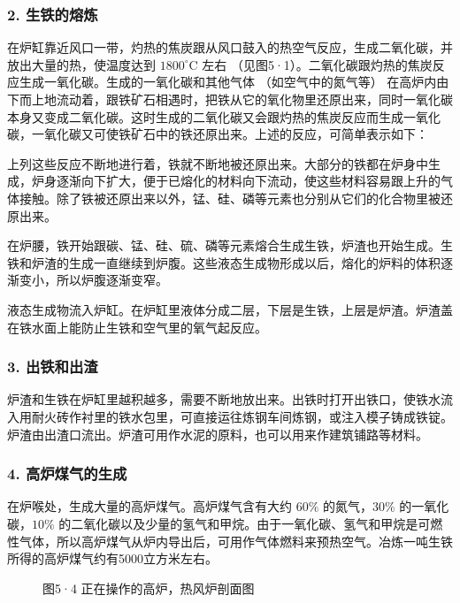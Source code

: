 \subsubsection{2. 生铁的熔炼}

在炉缸靠近风口一带，灼热的焦炭跟从风口鼓入的热空气反应，生成二氧化碳，并放出大量的热，使温度达到
\(1800^{\circ} \mathrm{C}\) 左右
（见图5·1）。二氧化碳跟灼热的焦炭反应生成一氧化碳。生成的一氧化碳和其他气体
（如空气中的氮气等）
在高炉内由下而上地流动着，跟铁矿石相遇时，把铁从它的氧化物里还原出来，同时一氧化碳本身又变成二氧化碳。这时生成的二氧化碳又会跟灼热的焦炭反应而生成一氧化碳，一氧化碳又可使铁矿石中的铁还原出来。上述的反应，可简单表示如下：

上列这些反应不断地进行着，铁就不断地被还原出来。大部分的铁都在炉身中生成，炉身逐渐向下扩大，便于已熔化的材料向下流动，使这些材料容易跟上升的气体接触。除了铁被还原出来以外，锰、硅、磷等元素也分别从它们的化合物里被还原出来。

在炉腰，铁开始跟碳、锰、硅、硫、磷等元素熔合生成生铁，炉渣也开始生成。生铁和炉渣的生成一直继续到炉腹。这些液态生成物形成以后，熔化的炉料的体积逐渐变小，所以炉腹逐渐变窄。

液态生成物流入炉缸。在炉缸里液体分成二层，下层是生铁，上层是炉渣。炉渣盖在铁水面上能防止生铁和空气里的氧气起反应。

\subsubsection{3. 出铁和出渣}

炉渣和生铁在炉缸里越积越多，需要不断地放出来。出铁时打开出铁口，使铁水流入用耐火砖作衬里的铁水包里，可直接运往炼钢车间炼钢，或注入模子铸成铁锭。炉渣由出渣口流出。炉渣可用作水泥的原料，也可以用来作建筑铺路等材料。

\subsubsection{4. 高炉煤气的生成}

在炉喉处，生成大量的高炉煤气。高炉煤气含有大约 \(60 \%\)
的氮气，\(30 \%\) 的一氧化碳，\(10 \%\)
的二氧化碳以及少量的氢气和甲烷。由于一氧化碳、氢气和甲烷是可燃性气体，所以高炉煤气从炉内导出后，可用作气体燃料来预热空气。冶炼一吨生铁所得的高炉煤气约有5000立方米左右。

\begin{figure}
\centering
\caption{图5·4 正在操作的高炉，热风炉剖面图}
\end{figure}

